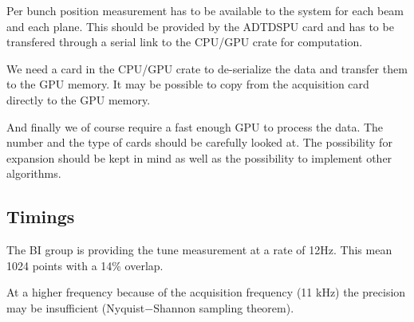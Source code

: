 Per bunch position measurement has to be available to the system for each beam and each plane. This should be provided by the \gls{ADTDSPU} card and has to be transfered through a serial link to the CPU/GPU crate for computation.

We need a card in the CPU/GPU crate to de-serialize the data and transfer them to the GPU memory. It may be possible to copy from the acquisition card directly to the GPU memory.

And finally we of course require a fast enough GPU to process the data. The number and the type of cards should be carefully looked at. The possibility for expansion should be kept in mind as well as the possibility to implement other algorithms.

\subsection{Timings}

The \gls{BI} group is providing the tune measurement at a rate of 12Hz. This mean 1024 points with a 14\% overlap. 

At a higher frequency because of the acquisition frequency (11 kHz) the precision may be insufficient (Nyquist$-$Shannon sampling theorem).
